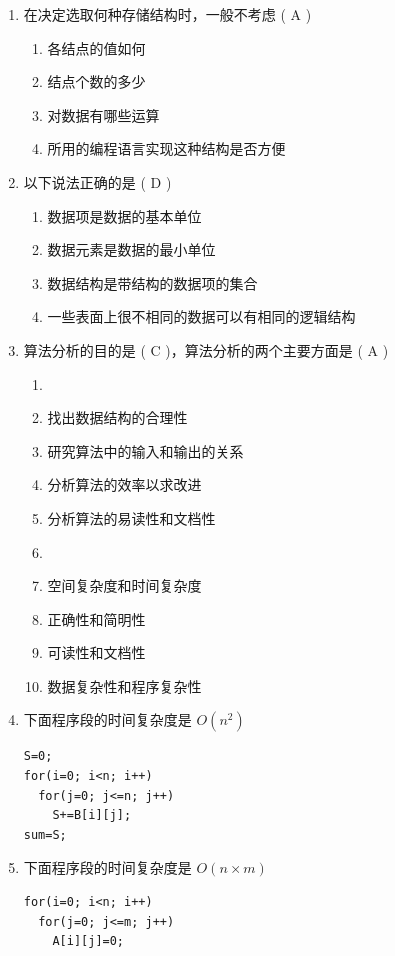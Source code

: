 \documentclass[12pt, a4paper]{article}
\begin{document}
\begin{enumerate}[label=\arabic*.]
    \item 在决定选取何种存储结构时，一般不考虑 ( A )
    \begin{enumerate}
        \item 各结点的值如何
        \item 结点个数的多少
        \item 对数据有哪些运算
        \item 所用的编程语言实现这种结构是否方便
    \end{enumerate}

    \item 以下说法正确的是 ( D )
    \begin{enumerate}
        \item 数据项是数据的基本单位
        \item 数据元素是数据的最小单位
        \item 数据结构是带结构的数据项的集合
        \item 一些表面上很不相同的数据可以有相同的逻辑结构
    \end{enumerate}

    \item 算法分析的目的是 ( C )，算法分析的两个主要方面是 ( A )
    \begin{enumerate}
        \item[(1)] 
        \item 找出数据结构的合理性
        \item 研究算法中的输入和输出的关系
        \item 分析算法的效率以求改进
        \item 分析算法的易读性和文档性
        \item[(2)]
        \item 空间复杂度和时间复杂度
        \item 正确性和简明性
        \item 可读性和文档性
        \item 数据复杂性和程序复杂性
    \end{enumerate}

    \item 下面程序段的时间复杂度是 $O(n^2)$
    \begin{verbatim}
S=0;
for(i=0; i<n; i++)
  for(j=0; j<=n; j++)
    S+=B[i][j];
sum=S;
    \end{verbatim}

    \item 下面程序段的时间复杂度是 $O(n \times m)$
    \begin{verbatim}
for(i=0; i<n; i++)
  for(j=0; j<=m; j++)
    A[i][j]=0;
    \end{verbatim}


\end{enumerate}
\end{document}
